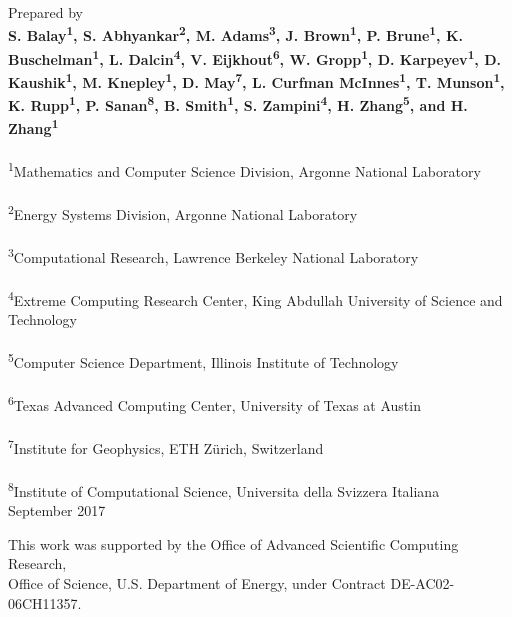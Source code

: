 \vspace*{0.5in}
\noindent Prepared by \\
{\bf S. Balay\textsuperscript{1}, S. Abhyankar\textsuperscript{2}, M. Adams\textsuperscript{3}, J. Brown\textsuperscript{1}, P. Brune\textsuperscript{1}, K. Buschelman\textsuperscript{1},
L. Dalcin\textsuperscript{4}, V. Eijkhout\textsuperscript{6}, W. Gropp\textsuperscript{1}, D. Karpeyev\textsuperscript{1},
D. Kaushik\textsuperscript{1}, M. Knepley\textsuperscript{1}, D. May\textsuperscript{7}, L. Curfman McInnes\textsuperscript{1}, T. Munson\textsuperscript{1},
K. Rupp\textsuperscript{1}, P. Sanan\textsuperscript{8}, B. Smith\textsuperscript{1}, S. Zampini\textsuperscript{4}, H. Zhang\textsuperscript{5}, and H. Zhang\textsuperscript{1}}\\
\\
\textsuperscript{1}Mathematics and Computer Science Division, Argonne National Laboratory \\
\\
\textsuperscript{2}Energy Systems Division, Argonne National Laboratory \\
\\
\textsuperscript{3}Computational Research, Lawrence Berkeley National Laboratory \\
\\
\textsuperscript{4}Extreme Computing Research Center, King Abdullah University of Science and Technology\\
\\
\textsuperscript{5}Computer Science Department, Illinois Institute of Technology\\
\\
\textsuperscript{6}Texas Advanced Computing Center, University of Texas at Austin\\
\\
\textsuperscript{7}Institute for Geophysics, ETH Zürich, Switzerland\\
\\
\textsuperscript{8}Institute of Computational Science, Universita della Svizzera Italiana\\


\vspace*{30pt}
\noindent September 2017

\vspace*{20pt}
\noindent This work was supported by the Office of Advanced Scientific Computing Research, \\
Office of Science, U.S. Department of Energy, under Contract DE-AC02-06CH11357.


